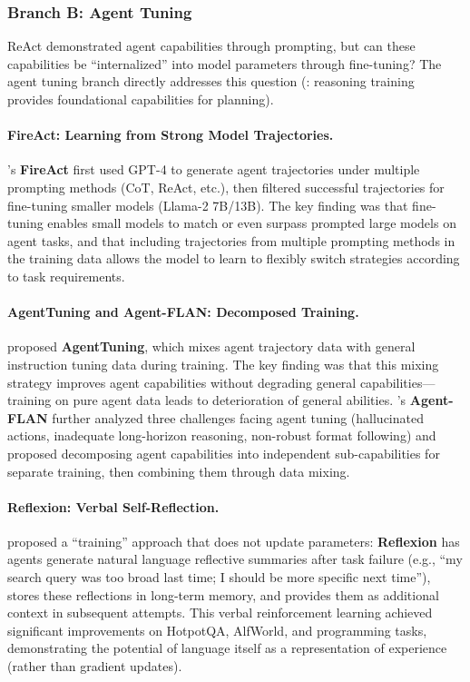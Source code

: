\subsubsection{Branch B: Agent Tuning}

ReAct demonstrated agent capabilities through prompting, but can these capabilities be ``internalized'' into model parameters through fine-tuning? The agent tuning branch directly addresses this question (: reasoning training provides foundational capabilities for planning).

\paragraph{FireAct: Learning from Strong Model Trajectories.}
\citet{chen2023fireact}'s \textbf{FireAct} first used GPT-4 to generate agent trajectories under multiple prompting methods (CoT, ReAct, etc.), then filtered successful trajectories for fine-tuning smaller models (Llama-2 7B/13B). The key finding was that fine-tuning enables small models to match or even surpass prompted large models on agent tasks, and that including trajectories from multiple prompting methods in the training data allows the model to learn to flexibly switch strategies according to task requirements.

\paragraph{AgentTuning and Agent-FLAN: Decomposed Training.}
\citet{zeng2023agenttuning} proposed \textbf{AgentTuning}, which mixes agent trajectory data with general instruction tuning data during training. The key finding was that this mixing strategy improves agent capabilities without degrading general capabilities---training on pure agent data leads to deterioration of general abilities. \citet{chen2024agentflan}'s \textbf{Agent-FLAN} further analyzed three challenges facing agent tuning (hallucinated actions, inadequate long-horizon reasoning, non-robust format following) and proposed decomposing agent capabilities into independent sub-capabilities for separate training, then combining them through data mixing.

\paragraph{Reflexion: Verbal Self-Reflection.}
\citet{shinn2023reflexion} proposed a ``training'' approach that does not update parameters: \textbf{Reflexion} has agents generate natural language reflective summaries after task failure (e.g., ``my search query was too broad last time; I should be more specific next time''), stores these reflections in long-term memory, and provides them as additional context in subsequent attempts. This verbal reinforcement learning achieved significant improvements on HotpotQA, AlfWorld, and programming tasks, demonstrating the potential of language itself as a representation of experience (rather than gradient updates).

